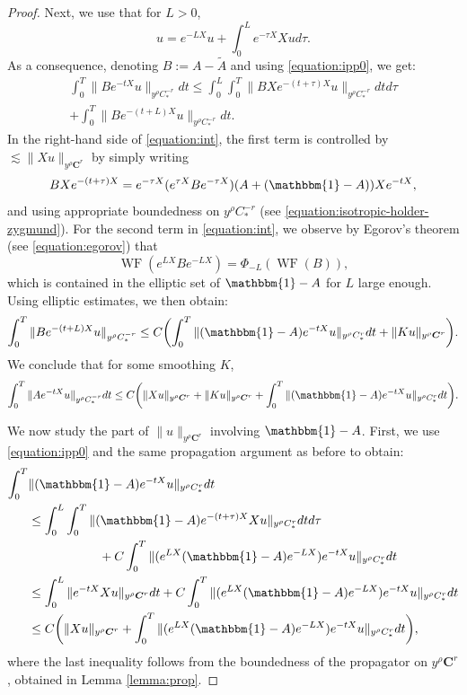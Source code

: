 \documentclass[JEP,XML,SOM,Unicode,NoFloatCountersInSection]{cedram}
\newcommand{\bC}{\boldsymbol{C}}
\DeclareMathOperator{\WF}{WF}
\theoremstyle{plain}
\theoremstyle{definition}
\begin{document}
\begin{proof}
Next, we use that for $L > 0$,
\begin{equation}
\label{equation:ipp0}
u= e^{-LX}u + \int_0^L e^{-\tau X} Xu d\tau.
\end{equation}
As a consequence, denoting $B:=A-\tilde{A}$ and using \eqref{equation:ipp0}, we get:
\begin{multline}
\label{equation:int}
\int_0^T \| B e^{-tX} u\|_{y^\rho C^{-r}_*} dt \leq \int_0^L \int_0^T \| B X e^{-(t+\tau)X}u\|_{y^\rho C^{-r}_*} dt d\tau \\
+ \int_0^T \|B e^{-(t+L)X}u\|_{y^\rho C^{-r}_*} dt.
\end{multline}
In the right-hand side of \eqref{equation:int}, the first term is controlled by $\lesssim \|Xu\|_{y^\rho \bC^r}$ by simply writing
\[
B X e^{-(t+\tau)X} = e^{-\tau X} (e^{\tau X} Be^{-\tau X})(A+(\mathbbm{1}-A)) X e^{-t X},
\]
and using appropriate boundedness on $y^\rho C^{-r}_*$ {\color{black}(see \eqref{equation:isotropic-holder-zygmund})}. For the second term in \eqref{equation:int}, we observe by Egorov's theorem (see \eqref{equation:egorov}) that
\[
\WF(e^{LX} B e^{-LX}) = \Phi_{-L}(\WF(B)),
\]
which is contained in the elliptic set of $\mathbbm{1}-A$ for $L$ large enough. Using elliptic estimates, we then obtain:
\[
\int_0^T \|B e^{-(t+L)X}u\|_{y^\rho C^{-r}_*} \leq C \biggl(\int_0^T \| (\mathbbm{1}-A)e^{-tX}u\|_{y^\rho C^r_*} dt + \| Ku\|_{y^\rho \bC^r}\biggr).
\]
We conclude that for some smoothing $K$,
\begin{equation}
\label{equation:1}
\int_0^T \| A e^{-tX} u\|_{y^\rho C^{-r}_*} dt \leq C \biggl(\| X u\|_{y^\rho \bC^r} + \| K u \|_{y^\rho \bC^r} + \int_0^T \| (\mathbbm{1}-A)e^{-tX} u\|_{y^\rho C^r_*} dt\biggr) .
\end{equation}

We now study the part of $\|u\|_{y^\rho\bC^r}$ involving $\mathbbm{1}-A$. First, we use \eqref{equation:ipp0} and the same propagation argument as before to obtain:
\[\begin{split}
\int_0^T & \| (\mathbbm{1}-A)e^{-tX} u\|_{y^\rho C^r_*} dt \\
& \leq \int_0^L \int_0^T \| (\mathbbm{1}-A) e^{-(t+\tau)X} X u\|_{y^\rho C^{r}_*} dt d\tau \\
&\hspace{2cm} +C \int_0^T \|(e^{LX}(\mathbbm{1}-A)e^{-LX}) e^{-t X}u\|_{y^\rho C^{r}_*} dt \\
& \leq \int_0^L \|e^{-tX}Xu\|_{y^\rho \bC^r} dt + C \int_0^T \|(e^{LX}(\mathbbm{1}-A)e^{-LX}) e^{-t X}u\|_{y^\rho C^{r}_*} dt \\
& \leq C \biggl( \|Xu\|_{y^\rho \bC^r} + \int_0^T \|(e^{LX}(\mathbbm{1}-A)e^{-LX}) e^{-t X}u\|_{y^\rho C^{r}_*} dt \biggr),
\end{split}
\]
where the last inequality follows from the boundedness of the propagator on $y^\rho \bC^r$, obtained in Lemma \ref{lemma:prop}.


\end{proof}
\end{document}
